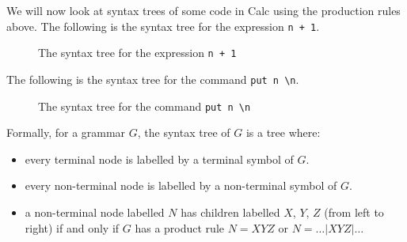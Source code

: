 \documentclass[a4paper, openany]{memoir}
\begin{document}
We will now look at syntax trees of some code in Calc using the production rules above. The following is the syntax tree for the expression \texttt{n + 1}.
\begin{figure}[H]
    \centering
    \caption{The syntax tree for the expression \texttt{n + 1}}
\end{figure}
\noindent The following is the syntax tree for the command \texttt{put n \textbackslash n}.
\begin{figure}[H]
    \centering
    \caption{The syntax tree for the command \texttt{put n \textbackslash n}}
\end{figure}

Formally, for a grammar $G$, the syntax tree of $G$ is a tree where:
\begin{itemize}
    \item every terminal node is labelled by a terminal symbol of $G$.
    \item every non-terminal node is labelled by a non-terminal symbol of $G$.
    \item a non-terminal node labelled $N$ has children labelled $X$, $Y$, $Z$ (from left to right) if and only if $G$ has a product rule $N = XYZ$ or $N = \dots | XYZ | \dots$
\end{itemize}
\end{document}
